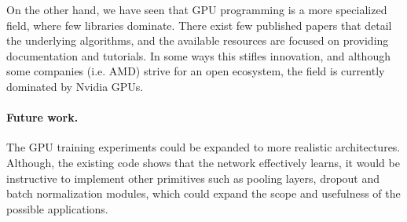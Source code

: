 On the other hand, we have seen that GPU programming is a more specialized field, where few
libraries dominate. There exist few published papers that detail the underlying algorithms, and the
available resources are focused on providing documentation and tutorials. In some ways this stifles
innovation, and although some companies (i.e. AMD) strive for an open ecosystem, the field is currently
dominated by Nvidia GPUs.

\paragraph{Future work.}
The GPU training experiments could be expanded to more realistic architectures. Although, the
existing code shows that the network effectively learns, it would be instructive to implement other
primitives such as pooling layers, dropout and batch normalization modules, which could expand the
scope and usefulness of the possible applications.



